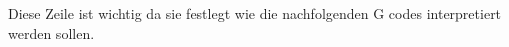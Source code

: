 
Diese Zeile ist wichtig da sie festlegt wie die nachfolgenden G codes interpretiert werden sollen.





%






